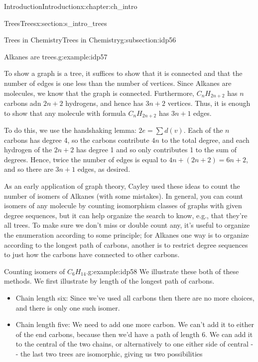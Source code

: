 \documentclass[oneside,10pt,]{book}
\numberwithin{equation}{section}
\begin{document}
\begin{chapterptx}{Introduction}{}{Introduction}{}{}{x:chapter:ch_intro}
\begin{sectionptx}{Trees}{}{Trees}{}{}{x:section:s_intro_trees}
\begin{subsectionptx}{Trees in Chemistry}{}{Trees in Chemistry}{}{}{g:subsection:idp56}
\begin{example}{Alkanes are trees.}{g:example:idp57}
\par
To show a graph is a tree, it suffices to show that it is connected and that the number of edges is one less than the number of vertices.  Since Alkanes are molecules, we know that the graph is connected.  Furthermore, \(C_nH_{2n+2}\) has \(n\) carbons adn \(2n+2\) hydrogens, and hence has \(3n+2\) vertices.  Thus, it is enough to show that any molecule with formula \(C_nH_{2n+2}\) has \(3n+1\) edges.%
\par
To do this, we use the handshaking lemma: \(2e=\sum d(v)\).  Each of the \(n\) carbons has degree 4, so the carbons contribute \(4n\) to the total degree, and each hydrogen of the \(2n+2\) has degree 1 and so only contributes 1 to the sum of degrees.  Hence, twice the number of edges is equal to \(4n+(2n+2)=6n+2\), and so there are \(3n+1\) edges, as desired.%
\end{example}
As an early application of graph theory, Cayley used these ideas to count the number of isomers of Alkanes (with some mistakes).  In general, you can count isomers of any molecule by counting isomorphism classes of graphs with given degree sequences, but it can help organize the search to know, e.g., that they're all trees.  To make sure we don't miss or double count any, it's useful to organize the enumeration according to some principle; for Alkanes one way is to organize according to the longest path of carbons, another is to restrict degree sequences to just how the carbons have connected to other carbons.%
\begin{example}{Counting isomers of \(C_6H_{14}\).}{g:example:idp58}%
We illustrate these both of these methods.  We first illustrate by length of the longest path of carbons.%
%
\begin{itemize}[label=\textbullet]
\item{}Chain length six: Since we've used all carbons then there are no more choices, and there is only one such isomer.%
\item{}Chain length five: We need to add one more carbon.  We can't add it to either of the end carbons, because then we'd have a path of length 6.  We can add it to the central of the two chains, or alternatively to one either side of central -{}-{} the last two trees are isomorphic, giving us two possibilities%

\end{itemize}
\end{example}
\end{subsectionptx}
\end{sectionptx}
\end{chapterptx}
\end{document}
